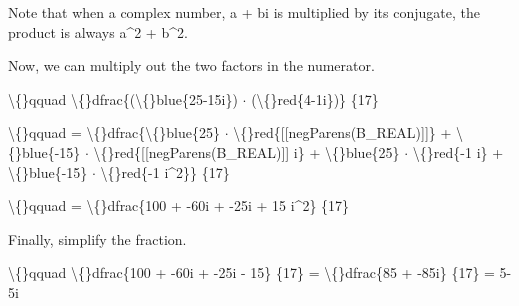 \documentclass{article}
\begin{document}
\begin{itemize}
                        Note that when a complex number, a + bi is multiplied by its conjugate,
                        the product is always a\textasciicircum{}2 + b\textasciicircum{}2.
                    
                
                
                    
                        Now, we can multiply out the two factors in the numerator.
                    
                    
                        \textbackslash\{\}qquad \textbackslash\{\}dfrac\{(\textbackslash\{\}blue\{25-15i\}) $\cdot$ (\textbackslash\{\}red\{4-1i\})\}
                        \{17\}
                    
                    
                        \textbackslash\{\}qquad = \textbackslash\{\}dfrac\{\textbackslash\{\}blue\{25\} $\cdot$ \textbackslash\{\}red\{[[negParens(B\_REAL)]]\} + \textbackslash\{\}blue\{-15\} $\cdot$ \textbackslash\{\}red\{[[negParens(B\_REAL)]] i\} + \textbackslash\{\}blue\{25\} $\cdot$ \textbackslash\{\}red\{-1 i\} + \textbackslash\{\}blue\{-15\} $\cdot$ \textbackslash\{\}red\{-1 i\textasciicircum{}2\}\}
                        \{17\}
                    
                    
                        \textbackslash\{\}qquad = \textbackslash\{\}dfrac\{100 + -60i + -25i + 15 i\textasciicircum{}2\}
                        \{17\}
                    
                
                
                    
                        Finally, simplify the fraction.
                    
                    
                        \textbackslash\{\}qquad \textbackslash\{\}dfrac\{100 + -60i + -25i - 15\}
                        \{17\} =
                        \textbackslash\{\}dfrac\{85 + -85i\}
                        \{17\} =
                        5-5i
\end{itemize}
\end{document}
